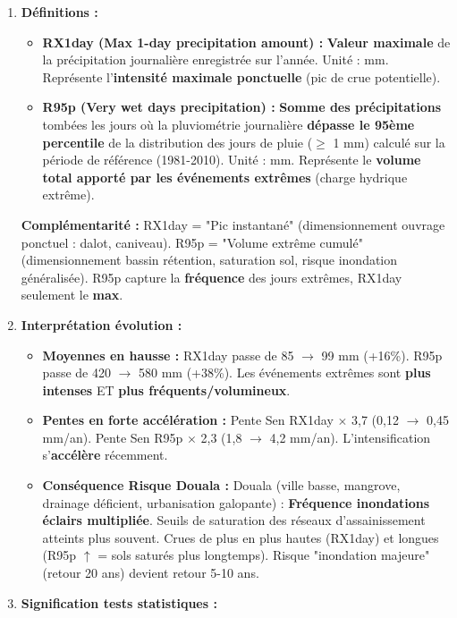 \documentclass[11pt]{article}
\begin{document}
\begin{exoresolu}
\begin{enumerate}
    \item \textbf{Définitions :}
          \begin{itemize}
              \item \textbf{RX1day (Max 1-day precipitation amount) :} \textbf{Valeur maximale} de la précipitation journalière enregistrée sur l'année. Unité : mm. Représente l'\textbf{intensité maximale ponctuelle} (pic de crue potentielle).
              \item \textbf{R95p (Very wet days precipitation) :} \textbf{Somme des précipitations} tombées les jours où la pluviométrie journalière \textbf{dépasse le 95ème percentile} de la distribution des jours de pluie ($\ge$ 1 mm) calculé sur la période de référence (1981-2010). Unité : mm. Représente le \textbf{volume total apporté par les événements extrêmes} (charge hydrique extrême).
          \end{itemize}
          \textbf{Complémentarité :} RX1day = "Pic instantané" (dimensionnement ouvrage ponctuel : dalot, caniveau). R95p = "Volume extrême cumulé" (dimensionnement bassin rétention, saturation sol, risque inondation généralisée). R95p capture la \textbf{fréquence} des jours extrêmes, RX1day seulement le \textbf{max}.
    \item \textbf{Interprétation évolution :}
          \begin{itemize}
              \item \textbf{Moyennes en hausse :} RX1day passe de 85 $\rightarrow$ 99 mm (+16\%). R95p passe de 420 $\rightarrow$ 580 mm (+38\%). Les événements extrêmes sont \textbf{plus intenses} ET \textbf{plus fréquents/volumineux}.
              \item \textbf{Pentes en forte accélération :} Pente Sen RX1day $\times$ 3,7 (0,12 $\rightarrow$ 0,45 mm/an). Pente Sen R95p $\times$ 2,3 (1,8 $\rightarrow$ 4,2 mm/an). L'intensification s'\textbf{accélère} récemment.
              \item \textbf{Conséquence Risque Douala :} Douala (ville basse, mangrove, drainage déficient, urbanisation galopante) : \textbf{Fréquence inondations éclairs multipliée}. Seuils de saturation des réseaux d'assainissement atteints plus souvent. Crues de plus en plus hautes (RX1day) et longues (R95p $\uparrow$ = sols saturés plus longtemps). Risque "inondation majeure" (retour 20 ans) devient retour 5-10 ans.
          \end{itemize}
    \item \textbf{Signification tests statistiques :}
          \begin{itemize}

\end{itemize}
\end{enumerate}
\end{exoresolu}
\end{document}
